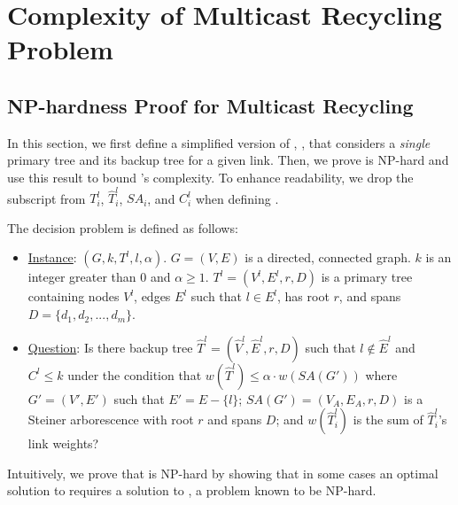\chapter{Complexity of Multicast Recycling Problem}

\section{NP-hardness Proof for Multicast Recycling}
\label{sec:mc-npc}

In this section, we first define a simplified version of \mcs, \mcos, that considers a \emph{single} primary tree and its backup tree for a given link.  Then, we prove \mco is NP-hard and use
this result to bound \mcs's complexity. To enhance readability, we drop the subscript from $T^l_i$, $\hat{T}^l_i$, $SA_i$, and $C_i^l$ when defining \mcos.

The \mco decision problem is defined as follows: %
\begin{itemize}

	\item  \underline{Instance}: $(G,k,T^l,l,\alpha)$.  $G=(V,E)$ is a directed, connected graph. $k$ is an integer greater than $0$ and $\alpha \geq 1$.
	$T^l=(V^l,E^l,r,D)$ is a primary tree containing nodes $V^l$, edges $E^l$ such that $l \in E^l$, has root $r$, and spans $D=\{d_1,d_2, ..., d_m\}$.

	\item \underline{Question}: Is there backup tree $\hat{T}^l=(\hat{V}^l,\hat{E}^l,r,D)$ such that $l \notin \hat{E}^l$ and $C^l \leq k$ under the condition that
		$w(\hat{T}^l) \leq \alpha \cdot w(SA(G'))$ where $G'=(V',E')$ such that $E' = E - \{l\}$; $SA(G') = (V_{A},E_{A},r,D)$ is a Steiner arborescence with root $r$ and spans $D$;
		and $w(\hat{T}^l_i)$ is the sum of $\hat{T}^l_i$'s link weights?
	
\end{itemize}
Intuitively, we prove that \mco is NP-hard by showing that in some cases an optimal solution to \mco requires a solution to \arbors, a problem known to be NP-hard.

